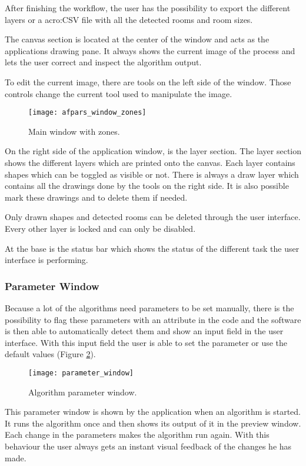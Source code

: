 After finishing the workflow, the user has the possibility to export the different layers or a \gls{acro:CSV} file with all the detected rooms and room sizes.

The canvas section is located at the center of the window and acts as the applications drawing pane. It always shows the current image of the process and lets the user correct and inspect the algorithm output.

To edit the current image, there are tools on the left side of the window. Those controls change the current tool used to manipulate the image.


\begin{figure}[H]
  \centering
      \texttt{[image: afpars\_window\_zones]}
  \caption{Main window with zones.}
  \label{fig:afpars_window_zones}
\end{figure}

On the right side of the application window, is the layer section. The layer section shows the different layers which are printed onto the canvas. Each layer contains shapes which can be toggled as visible or not. There is always a draw layer which contains all the drawings done by the tools on the right side. It is also possible mark these drawings and to delete them if needed.

Only drawn shapes and detected rooms can be deleted through the user interface. Every other layer is locked and can only be disabled.

At the base is the status bar which shows the status of the different task the user interface is performing.


\subsubsection{Parameter Window} \label{sub:parameter_window}
Because a lot of the algorithms need parameters to be set manually, there is the possibility to flag these parameters with an attribute in the code and the software is then able to automatically detect them and show an input field in the user interface. With this input field the user is able to set the parameter or use the default values (Figure \ref{fig:parameter_window}).


\begin{figure}[H]
  \centering
      \texttt{[image: parameter\_window]}
  \caption{Algorithm parameter window.}
  \label{fig:parameter_window}
\end{figure}

This parameter window is shown by the application when an algorithm is started. It runs the algorithm once and then shows its output of it in the preview window. Each change in the parameters makes the algorithm run again. With this behaviour the user always gets an instant visual feedback of the changes he has made.